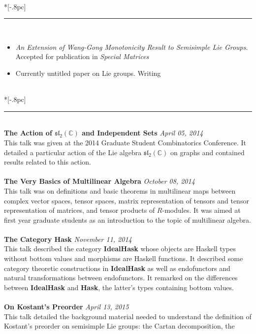 \documentclass{article}
\begin{document}
 \\*[-.8pc]
\rule{\textwidth}{.1pt} \\
\begin{itemize}[noitemsep]
\item \emph{An Extension of Wang-Gong Monotonicity Result to Semisimple Lie
    Groups}. Accepted for publication in \textit{Special Matrices}
\item Currently untitled paper on Lie groups. Writing
\end{itemize}
\vspace{1ex}
 \\*[-.8pc]
\rule{\textwidth}{.1pt} \\
\textbf{The Action of \( \mathfrak{sl}_2(\mathbb{C}) \) and Independent Sets}
\hfill \textit{April 05, 2014}\\
This talk was given at the 2014 Graduate Student Combinatorics Conference. It
detailed a particular action of the Lie algebra
\( \mathfrak{sl}_2(\mathbb{C}) \) on graphs and contained results related to
this action.
\\ \\
\textbf{The Very Basics of Multilinear Algebra} \hfill \textit{October 08,
  2014}\\
This talk was on definitions and basic theorems in multilinear maps between
complex vector spaces, tensor spaces, matrix representation of tensors and
tensor representation of matrices, and tensor products of $R$-modules. It was
aimed at first year graduate students as an introduction to the topic of
multilinear algebra.
\\ \\
\textbf{The Category \textup{Hask}} \hfill \textit{November 11, 2014}\\
This talk described the category \textbf{IdealHask} whose objects are Haskell
types without bottom values and morphisms are Haskell functions. It described
some category theoretic constructions in \textbf{IdealHask} as well as
endofunctors and natural transformations between endofunctors. It remarked on
the differences between \textbf{IdealHask} and \textbf{Hask}, the latter's types
containing bottom values.
\\ \\
\textbf{On Kostant's Preorder} \hfill \textit{April 13, 2015}\\
This talk detailed the background material needed to understand the definition
of Kostant's preorder on semisimple Lie groups: the Cartan decomposition, the
\end{document}
